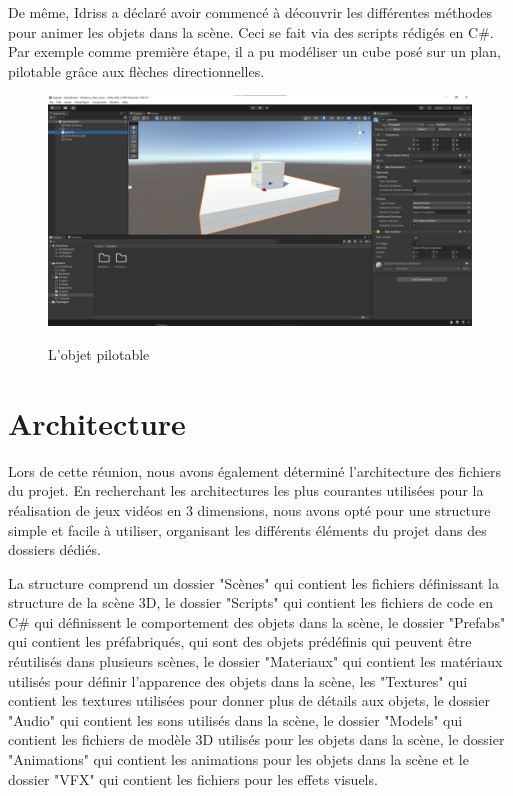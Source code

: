 \documentclass[a4paper, 12pt]{article}
\begin{document}
\newpage

De même, Idriss a déclaré avoir commencé à découvrir les différentes méthodes pour animer les objets dans la scène. Ceci se fait via des scripts rédigés en C\#. Par exemple comme première étape, il a pu modéliser un cube posé sur un plan, pilotable grâce aux flèches directionnelles. 

\begin{figure}[!h]
    \centering
    \includegraphics[scale=0.27]{cube.png}
    \label{fig:Le_planning}
    \caption{L'objet pilotable}
\end{figure}

\newpage

\section{Architecture}

Lors de cette réunion, nous avons également déterminé l'architecture des fichiers du projet. En recherchant les architectures les plus courantes utilisées pour la réalisation de jeux vidéos en 3 dimensions, nous avons opté pour une structure simple et facile à utiliser, organisant les différents éléments du projet dans des dossiers dédiés. 

La structure comprend un dossier "Scènes" qui contient les fichiers définissant la structure de la scène 3D, le dossier "Scripts" qui contient les fichiers de code en C\# qui définissent le comportement des objets dans la scène, le dossier "Prefabs" qui contient les préfabriqués, qui sont des objets prédéfinis qui peuvent être réutilisés dans plusieurs scènes, le dossier "Materiaux" qui contient les matériaux utilisés pour définir l'apparence des objets dans la scène, les "Textures" qui contient les textures utilisées pour donner plus de détails aux objets, le dossier "Audio" qui contient les sons utilisés dans la scène, le dossier "Models" qui contient les fichiers de modèle 3D utilisés pour les objets dans la scène, le dossier "Animations" qui contient les animations pour les objets dans la scène et le dossier "VFX" qui contient les fichiers pour les effets visuels.
\end{document}
